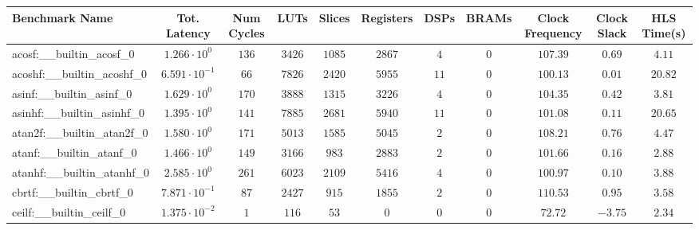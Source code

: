 \begin{tabular}{|l|c|c|c|c|c|c|c|c|c|c|}
\hline
Benchmark Name                            & Tot. Latency            & Num Cycles & LUTs       & Slices    & Registers & DSPs    & BRAMs & Clock Frequency & Clock Slack & HLS Time(s) \\
\hline
acosf:\_\_builtin\_acosf\_0               & $ 1.266 \cdot 10^{0}  $ & $ 136    $ & $ 3426   $ & $ 1085  $ & $ 2867  $ & $ 4   $ & $ 0 $ & $ 107.39      $ & $ 0.69    $ & $ 4.11    $ \\
acoshf:\_\_builtin\_acoshf\_0             & $ 6.591 \cdot 10^{-1} $ & $ 66     $ & $ 7826   $ & $ 2420  $ & $ 5955  $ & $ 11  $ & $ 0 $ & $ 100.13      $ & $ 0.01    $ & $ 20.82   $ \\
asinf:\_\_builtin\_asinf\_0               & $ 1.629 \cdot 10^{0}  $ & $ 170    $ & $ 3888   $ & $ 1315  $ & $ 3226  $ & $ 4   $ & $ 0 $ & $ 104.35      $ & $ 0.42    $ & $ 3.81    $ \\
asinhf:\_\_builtin\_asinhf\_0             & $ 1.395 \cdot 10^{0}  $ & $ 141    $ & $ 7885   $ & $ 2681  $ & $ 5940  $ & $ 11  $ & $ 0 $ & $ 101.08      $ & $ 0.11    $ & $ 20.65   $ \\
atan2f:\_\_builtin\_atan2f\_0             & $ 1.580 \cdot 10^{0}  $ & $ 171    $ & $ 5013   $ & $ 1585  $ & $ 5045  $ & $ 2   $ & $ 0 $ & $ 108.21      $ & $ 0.76    $ & $ 4.47    $ \\
atanf:\_\_builtin\_atanf\_0               & $ 1.466 \cdot 10^{0}  $ & $ 149    $ & $ 3166   $ & $ 983   $ & $ 2883  $ & $ 2   $ & $ 0 $ & $ 101.66      $ & $ 0.16    $ & $ 2.88    $ \\
atanhf:\_\_builtin\_atanhf\_0             & $ 2.585 \cdot 10^{0}  $ & $ 261    $ & $ 6023   $ & $ 2109  $ & $ 5416  $ & $ 4   $ & $ 0 $ & $ 100.97      $ & $ 0.10    $ & $ 3.88    $ \\
cbrtf:\_\_builtin\_cbrtf\_0               & $ 7.871 \cdot 10^{-1} $ & $ 87     $ & $ 2427   $ & $ 915   $ & $ 1855  $ & $ 2   $ & $ 0 $ & $ 110.53      $ & $ 0.95    $ & $ 3.58    $ \\
ceilf:\_\_builtin\_ceilf\_0               & $ 1.375 \cdot 10^{-2} $ & $ 1      $ & $ 116    $ & $ 53    $ & $ 0     $ & $ 0   $ & $ 0 $ & $ 72.72       $ & $ -3.75   $ & $ 2.34    $ \\

\end{tabular}

